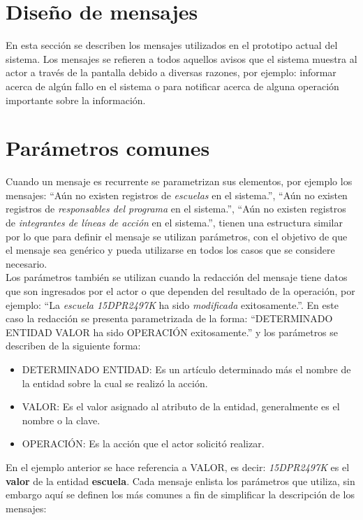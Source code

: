 \section{Diseño de mensajes}
	En esta sección se describen los mensajes utilizados en el prototipo actual del sistema. Los mensajes se refieren a todos
	aquellos avisos que el sistema muestra al actor a través de la pantalla debido a diversas
	razones, por ejemplo: informar acerca de algún fallo en el sistema o para notificar acerca de alguna operación importante sobre
	la información.

\section{Parámetros comunes}
    Cuando un mensaje es recurrente se parametrizan sus elementos, por ejemplo los mensajes: ``Aún no existen registros de {\em escuelas} en el sistema.'', ``Aún no existen registros de {\em responsables del programa} en el sistema.'', 
    ``Aún no existen registros de {\em integrantes de líneas de acción} en el sistema.'', tienen una estructura similar 
    por lo que para definir el mensaje se utilizan parámetros, con el objetivo de que el mensaje sea genérico y  
    pueda utilizarse en todos los casos que se considere necesario.\\
    
    Los parámetros también se utilizan cuando la redacción del mensaje tiene datos que son ingresados por el actor o que dependen del resultado de la operación, por ejemplo: 
    ``La {\em escuela  15DPR2497K} ha sido {\em modificada} exitosamente.''. En este caso la redacción se presenta parametrizada de la forma: ``DETERMINADO ENTIDAD VALOR ha sido OPERACIÓN exitosamente.'' y los 
    parámetros se describen de la siguiente forma:
    
    \begin{itemize}
	\item DETERMINADO ENTIDAD: Es un artículo determinado más el nombre de la entidad sobre la cual se realizó la acción.
	\item VALOR: Es el valor asignado al atributo de la entidad, generalmente es el nombre o la clave.
	\item OPERACIÓN: Es la acción que el actor solicitó realizar.
    \end{itemize}

    En el ejemplo anterior se hace referencia a VALOR, es decir: {\em 15DPR2497K} es el {\bf valor}  de la entidad {\bf escuela}. Cada mensaje enlista los parámetros 
    que utiliza, sin embargo aquí se definen los más comunes a fin de simplificar la descripción de los mensajes:

